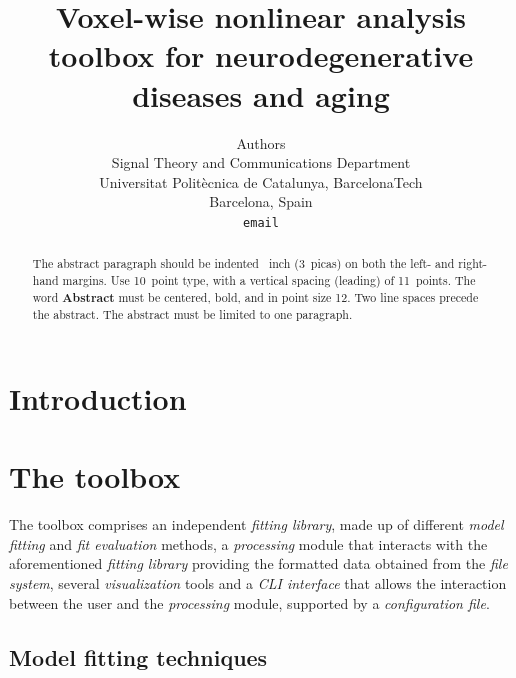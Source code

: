 \documentclass{article}
\title{Voxel-wise nonlinear analysis toolbox for neurodegenerative diseases and aging}
\author{
  Authors\\
  Signal Theory and Communications Department\\
  Universitat Politècnica de Catalunya, BarcelonaTech\\
  Barcelona, Spain \\
  \texttt{email}\\
}
\begin{document}

\maketitle

\begin{abstract}
  The abstract paragraph should be indented ~inch
  (3~picas) on both the left- and right-hand margins. Use 10~point
  type, with a vertical spacing (leading) of 11~points.  The word
  \textbf{Abstract} must be centered, bold, and in point size 12. Two
  line spaces precede the abstract. The abstract must be limited to
  one paragraph.
\end{abstract}

\section{Introduction}

\section{The toolbox}
\label{toolbox}

The toolbox comprises an independent \textit{fitting library}, made up of different \textit{model fitting} and \textit{fit evaluation} methods, a \textit{processing} module that interacts with the aforementioned \textit{fitting library} providing the formatted data obtained from the \textit{file system}, several \textit{visualization} tools and a \textit{CLI interface} that allows the interaction between the user and the \textit{processing} module, supported by a \textit{configuration file}. 

\subsection{Model fitting techniques}
\end{document}
